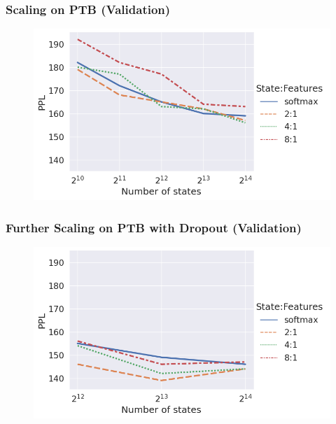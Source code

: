 \documentclass{beamer}
\begin{document}
\begin{frame}
\frametitle{Scaling on PTB (Validation)}
\begin{center}
\begin{figure}
\includegraphics[width=\textwidth]{img/lhmm-states-features.png}
\end{figure}
\end{center}
\end{frame}

\begin{frame}
\frametitle{Further Scaling on PTB with Dropout (Validation)}
\begin{center}
\begin{figure}
\includegraphics[width=\textwidth]{img/lhmm-states-features-dropout.png}
\end{figure}
\end{center}
\end{frame}
\end{document}
